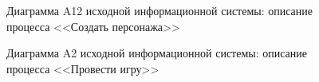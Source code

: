 \begin{figure}[h]
\caption{Диаграмма A12 исходной информационной системы: описание процесса <<Создать персонажа>>}
\label{ris:current_a12_diagram}
\end{figure}

\begin{figure}[h]
\caption{Диаграмма A2 исходной информационной системы: описание процесса <<Провести игру>>}
\label{ris:current_a2_diagram}
\end{figure}

